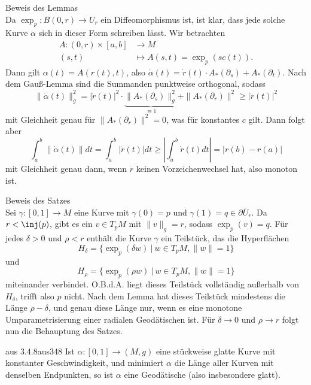 \begin{beweis} Beweis des Lemmas\\
Da $\exp_p: B(0,r) \to U_r$ ein Diffeomorphismus ist, ist klar, dass jede solche Kurve $\alpha$ sich in dieser Form schreiben lässt. Wir betrachten 
\begin{align}
A: (0,r) \times [a,b] &\to M \\
(s,t) &\mapsto A(s,t)=\exp_p(sc(t)).
\end{align}
Dann gilt $\alpha(t) = A(r(t), t)$, also $\dot{\alpha}(t) = \dot{r}(t) \cdot A_\ast(\partial_s) + A_\ast (\partial_t)$. Nach dem Gauß-Lemma sind die Summanden punktweise orthogonal, sodass
\begin{equation}
\| \dot{\alpha} (t) \|^2_g = | \dot{r}(t)|^2 \cdot \underbrace{\| A_\ast (\partial_s) \|_g^2}_{\equiv 1} + \| A_\ast (\partial_r)\|^2 \geq |\dot{r}(t)|^2
\end{equation}
mit Gleichheit genau für $\| A_\ast (\partial_r)\|^2 = 0$, was für konstantes $c$ gilt. Dann folgt aber
\begin{equation}
\int_a^b \| \dot{\alpha} (t) \| dt = \int_a^b |\dot{r}(t)|dt \geq \left| \int_a^b \dot{r} (t) dt \right| = |r(b)-r(a)|
\end{equation}
mit Gleichheit genau dann, wenn $\dot{r}$ keinen Vorzeichenwechsel hat, also monoton ist.
\end{beweis}
\begin{beweis} Beweis des Satzes\\
Sei $\gamma: [0,1] \to M$ eine Kurve mit $\gamma(0) = p$ und $\gamma (1) = q \in \partial \bar{U}_r$. Da $r < \inj(p)$, gibt es ein $v \in T_pM$ mit $\|v\|_g = r$, sodass $\exp_p(v)=q$. Für jedes $\delta > 0$ und $\rho < r$ enthält die Kurve $\gamma$ ein Teilstück, das die Hyperflächen
\begin{equation}
H_\delta = \{ \exp_p (\delta w) \ | \ w \in T_pM, \|w\| = 1 \}
\end{equation}
und 
\begin{equation}
H_\rho = \{ \exp_p (\rho w) \ | \ w \in T_pM, \|w\| = 1 \}
\end{equation}
miteinander verbindet. O.B.d.A. liegt dieses Teilstück vollständig außerhalb von $H_\delta$, trifft also $p$ nicht. Nach dem Lemma hat dieses Teilstück mindestens die Länge $\rho - \delta$, und genau diese Länge nur, wenn es eine monotone Umparametrisierung einer radialen Geodätischen ist. Für $\delta \to 0$ und $\rho \to r$ folgt nun die Behauptung des Satzes.
\end{beweis}
\begin{korollar}{aus 3.4.8}{aus348}
Ist $\alpha: [0,1] \to (M,g)$ eine stückweise glatte Kurve mit konstanter Geschwindigkeit, und minimiert $\alpha$ die Länge aller Kurven mit denselben Endpunkten, so ist $\alpha$ eine Geodätische (also insbesondere glatt).
\end{korollar}
